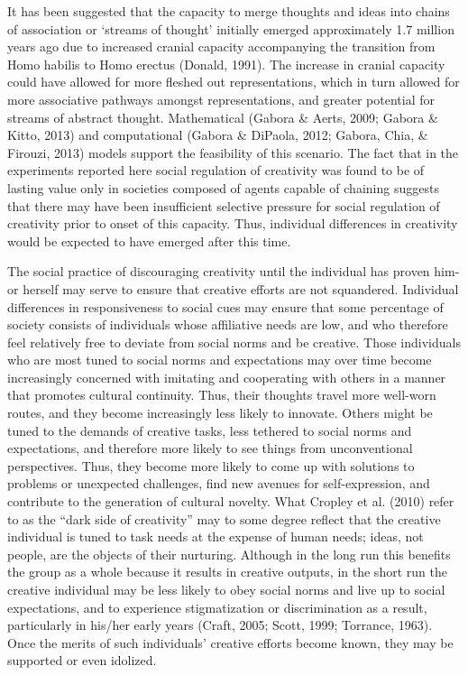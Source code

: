 \documentclass[a4paper,12pt,man,british]{apa6}
\begin{document}
It has been suggested that the capacity to merge thoughts and ideas into chains of association or `streams of thought' initially emerged approximately 1.7 million years ago due to increased cranial capacity accompanying the transition from Homo habilis to Homo erectus (Donald, 1991). The increase in cranial capacity could have allowed for more fleshed out representations, which in turn allowed for more associative pathways amongst representations, and greater potential for streams of abstract thought. Mathematical (Gabora \& Aerts, 2009; Gabora \& Kitto, 2013) and computational (Gabora \& DiPaola, 2012; Gabora, Chia, \& Firouzi, 2013) models support the feasibility of this scenario. The fact that in the experiments reported here social regulation of creativity was found to be of lasting value only in societies composed of agents capable of chaining suggests that there may have been insufficient selective pressure for social regulation of creativity prior to onset of this capacity. Thus, individual differences in creativity would be expected to have emerged after this time.

The social practice of discouraging creativity until the individual has proven him- or herself may serve to ensure that creative efforts are not squandered. 
Individual differences in responsiveness to social cues may ensure that some percentage of society consists of individuals whose affiliative needs are low, and who therefore feel relatively free to deviate from social norms and be creative. Those individuals who are most tuned to social norms and expectations may over time become increasingly concerned with imitating and cooperating with others in a manner that promotes cultural continuity. Thus, their thoughts travel more well-worn routes, and they become increasingly less likely to innovate. Others might be tuned to the demands of creative tasks,  less tethered to social norms and expectations, and therefore more likely to see things from unconventional perspectives. Thus, they become more likely to come up with solutions to problems or unexpected challenges, find new avenues for self-expression, and contribute to the generation of cultural novelty. What Cropley et al. (2010) refer to as the ``dark side of creativity'' may to some degree reflect that the creative individual is tuned to task needs at the expense of human needs; ideas, not people, are the objects of their nurturing. Although in the long run this benefits the group as a whole because it results in creative outputs, in the short run the creative individual may be less likely to obey social norms and live up to social expectations, and to experience stigmatization or discrimination as a result, particularly in his/her early years (Craft, 2005; Scott, 1999; Torrance, 1963). Once the merits of such individuals' creative efforts become known, they may be supported or even idolized.
\end{document}
